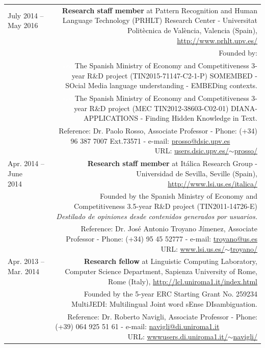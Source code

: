 \documentclass[10pt]{article}
\begin{document}
\begin{tabular}{L!{\VRule}R}
July 2014 -- May 2016 ~~&{\textbf{Research staff member} at Pattern Recognition and Human Language Technology (PRHLT) Research Center - Universitat Polit{\`e}cnica de Val{\`e}ncia, Valencia (Spain),
\url{http://www.prhlt.upv.es/}}\\
&\scriptsize{Founded by:}\\
&\scriptsize{\textcolor{white}{ssss}The Spanish Ministry of Economy and Competitiveness 3-year R\&D project (TIN2015-71147-C2-1-P) SOMEMBED - SOcial Media language 
understanding - EMBEDing contexts.}\\
&\scriptsize{\textcolor{white}{ssss}The Spanish Ministry of Economy and Competitiveness 3-year R\&D project (MEC TIN2012-38603-C02-01) DIANA-APPLICATIONS - Finding Hidden Knowledge 
in Text.}\\
&\scriptsize{Reference: Dr. Paolo Rosso, Associate Professor - Phone: (+34) 96 387 7007 Ext.73571 - e-mail: \href{mailto:prosso@dsic.upv.es}{prosso@dsic.upv.es} ~~~~~~~ URL: \href{http://users.dsic.upv.es/~prosso/}{users.dsic.upv.es/$\sim$prosso/}}\\

Apr. 2014 -- June 2014~~~~&{\textbf{Research staff member} at It{\'a}lica Research Group - Universidad de Sevilla, Seville (Spain), 
\url{http://www.lsi.us.es/italica/}}\\
&\scriptsize{Founded by the Spanish Ministry of Economy and Competitiveness 3.5-year R\&D project (TIN2011-14726-E) \emph{Destilado de opiniones desde contenidos generados por 
usuarios.}}\\
&\scriptsize{Reference: Dr. Jos{\'e} Antonio Troyano J{\'i}menez, Associate Professor - Phone: (+34) 95 45 52777 - e-mail: \href{mailto:troyano@us.es}{troyano@us.es} ~~~~~~~ URL: \href{http://www.lsi.us.es/~troyano/}{www.lsi.us.es/$\sim$troyano/}}\\
 
Apr. 2013 -- Mar. 2014 ~~&{\textbf{Research fellow} at Linguistic Computing Laboratory, Computer Science Department, Sapienza University of Rome, Rome (Italy), \url{http://lcl.uniroma1.it/index.html}}\\
&\scriptsize{Founded by the 5-year ERC Starting Grant No. 259234 MultiJEDI: Multilingual Joint word sEnse DIsambiguation.}\\
&\scriptsize{Reference: Dr. Roberto Navigli, Associate Professor - Phone: (+39) 064 925 51 61 - e-mail: \href{mailto:navigli@di.uniroma1.it}{navigli@di.uniroma1.it} ~~~~~~~~~~ URL: \href{http://wwwusers.di.uniroma1.it/~navigli/}{wwwusers.di.uniroma1.it/$\sim$navigli/}}\\


\end{tabular}
\end{document}
